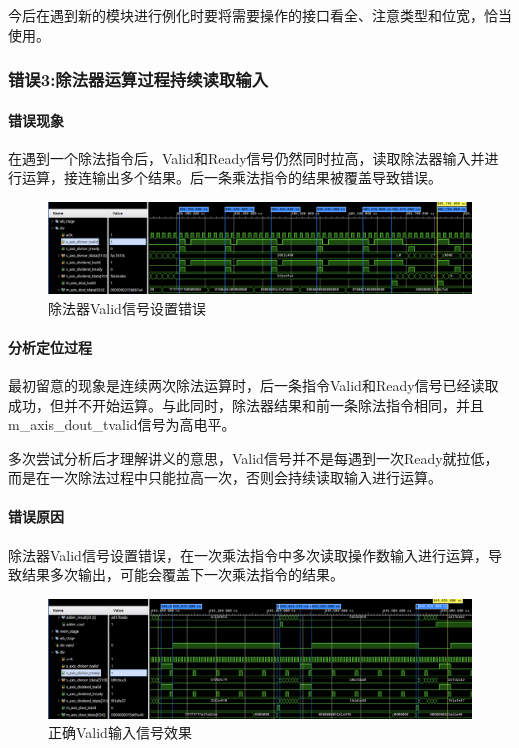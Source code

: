 \documentclass[UTF-8,twoside,c5size]{ctexart}
\begin{document}
	今后在遇到新的模块进行例化时要将需要操作的接口看全、注意类型和位宽，恰当使用。
	
	\subsubsection{错误\textbf{3:}除法器运算过程持续读取输入}
	
	\paragraph{错误现象}\hfill
	
	在遇到一个除法指令后，Valid和Ready信号仍然同时拉高，读取除法器输入并进行运算，接连输出多个结果。后一条乘法指令的结果被覆盖导致错误。
	
	\begin{figure}[h]
		\centering
		\includegraphics[width=1\linewidth]{valid_error.png}
		\caption[valid\_errpr]{除法器Valid信号设置错误}
		\label{fig:validerror}
	\end{figure}
	
	
	\paragraph{分析定位过程}\hfill
	
	最初留意的现象是连续两次除法运算时，后一条指令Valid和Ready信号已经读取成功，但并不开始运算。与此同时，除法器结果和前一条除法指令相同，并且m\_axis\_dout\_tvalid信号为高电平。
	
	多次尝试分析后才理解讲义的意思，Valid信号并不是每遇到一次Ready就拉低，而是在一次除法过程中只能拉高一次，否则会持续读取输入进行运算。
	
	\paragraph{错误原因}\hfill
	
	除法器Valid信号设置错误，在一次乘法指令中多次读取操作数输入进行运算，导致结果多次输出，可能会覆盖下一次乘法指令的结果。
	
	\begin{figure}[h]
		\centering
		\includegraphics[width=1\linewidth]{valid_correct.png}
		\caption[Valid\_correct]{正确Valid输入信号效果}
		\label{fig:validcorrect}
	\end{figure}
\end{document}
